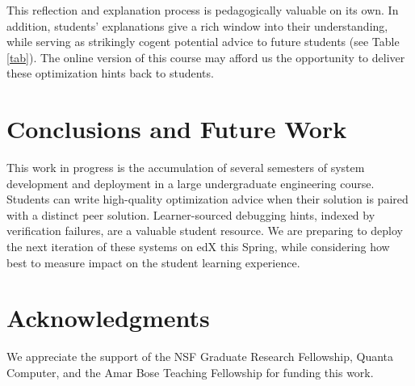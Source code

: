 \documentclass{chi-ext}
\begin{document}

This reflection and explanation process is pedagogically valuable on its own. In addition, students' explanations give a rich window into their understanding, while serving as strikingly cogent potential advice to future students (see Table \ref{tab}). The online version of this course may afford us the opportunity to deliver these optimization hints back to students.

\section{Conclusions and Future Work}

This work in progress is the accumulation of several semesters of system development and deployment in a large undergraduate engineering course. Students can write high-quality optimization advice when their solution is paired with a distinct peer solution. Learner-sourced debugging hints, indexed by verification failures, are a valuable student resource. We are preparing to deploy the next iteration of these systems on edX this Spring, while considering how best to measure impact on the student learning experience.

\section{Acknowledgments}

We appreciate the support of the NSF Graduate Research Fellowship, Quanta Computer, and the Amar Bose Teaching Fellowship for funding this work.





\balance
\end{document}

